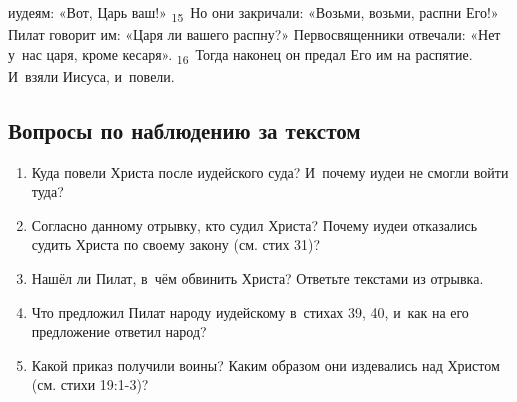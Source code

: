 \documentclass[a4paper,12pt]{article}
\begin{document}
иудеям: «Вот, Царь ваш!» \textsubscript{15}~Но они закричали: «Возьми, возьми, распни Его!» Пилат говорит им: «Царя ли вашего распну?» Первосвященники отвечали: «Нет у~нас царя, кроме кесаря». \textsubscript{16}~Тогда наконец он предал Его им на распятие. И~взяли Иисуса, и~повели. 
\subsection*{Вопросы по наблюдению за текстом}
\begin{enumerate}
    \item Куда повели Христа после иудейского суда? И~почему иудеи не смогли войти туда? 
    
    \myline
    
    \myline
    \item Согласно данному отрывку, кто судил Христа? Почему иудеи отказались судить Христа по своему закону (см. стих 31)? 
    
    \myline
    
    \myline
    \item Нашёл ли Пилат, в~чём обвинить Христа? Ответьте текстами из отрывка. 
    
    \myline
    
    \myline
    \item Что предложил Пилат народу иудейскому в~стихах 39, 40, и~как на его предложение ответил народ? 
    
    \myline
    
    \myline
    \item Какой приказ получили воины? Каким образом они издевались над Христом (см. стихи 19:1-3)? 
    
    \myline
    
    \myline
\end{enumerate}
\end{document}
